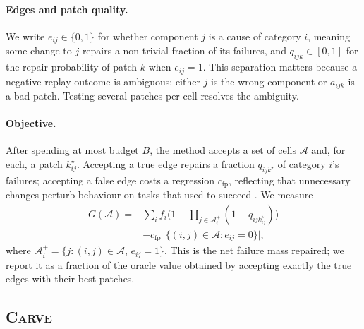 \documentclass[11pt]{article}
\newcommand{\carve}{\textsc{Carve}}
\begin{document}
\paragraph{Edges and patch quality.} We write $e_{ij}\in\{0,1\}$ for whether component $j$ is a cause of category $i$, meaning some change to $j$ repairs a non-trivial fraction of its failures, and $q_{ijk}\in[0,1]$ for the repair probability of patch $k$ when $e_{ij}=1$. This separation matters because a negative replay outcome is ambiguous: either $j$ is the wrong component or $a_{ijk}$ is a bad patch. Testing several patches per cell resolves the ambiguity.

\paragraph{Objective.} After spending at most budget $B$, the method accepts a set of cells $\mathcal{A}$ and, for each, a patch $k^\star_{ij}$. Accepting a true edge repairs a fraction $q_{ijk^\star}$ of category $i$'s failures; accepting a false edge costs a regression $c_{\mathrm{fp}}$, reflecting that unnecessary changes perturb behaviour on tasks that used to succeed \citep{vasudev2026intervention}. We measure
\begin{equation}
\begin{aligned}
G(\mathcal{A}) = {}&\sum_i f_i\Big(1-\!\!\prod_{j\in\mathcal{A}_i^+}\!\!(1-q_{ijk^\star_{ij}})\Big)\\
&- c_{\mathrm{fp}}\,\big|\{(i,j)\in\mathcal{A}:e_{ij}=0\}\big|,
\end{aligned}
\label{eq:gain}
\end{equation}
where $\mathcal{A}_i^+=\{j:(i,j)\in\mathcal{A},\,e_{ij}=1\}$. This is the net failure mass repaired; we report it as a fraction of the oracle value obtained by accepting exactly the true edges with their best patches.


\subsection{\carve{}}
\label{app:cmethod}
\end{document}
